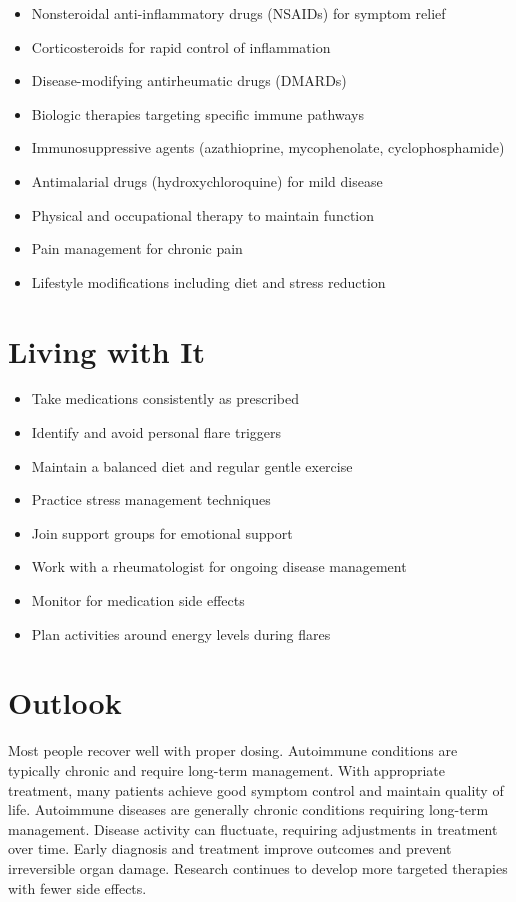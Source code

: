 \begin{itemize}[noitemsep]
  \item Nonsteroidal anti-inflammatory drugs (NSAIDs) for symptom relief
  \item Corticosteroids for rapid control of inflammation
  \item Disease-modifying antirheumatic drugs (DMARDs)
  \item Biologic therapies targeting specific immune pathways
  \item Immunosuppressive agents (azathioprine, mycophenolate, cyclophosphamide)
  \item Antimalarial drugs (hydroxychloroquine) for mild disease
  \item Physical and occupational therapy to maintain function
  \item Pain management for chronic pain
  \item Lifestyle modifications including diet and stress reduction
\end{itemize}
\section{Living with It}
\begin{itemize}[noitemsep]
  \item Take medications consistently as prescribed
  \item Identify and avoid personal flare triggers
  \item Maintain a balanced diet and regular gentle exercise
  \item Practice stress management techniques
  \item Join support groups for emotional support
  \item Work with a rheumatologist for ongoing disease management
  \item Monitor for medication side effects
  \item Plan activities around energy levels during flares
\end{itemize}
\section{Outlook}
Most people recover well with proper dosing. Autoimmune conditions are typically chronic and require long-term management. With appropriate treatment, many patients achieve good symptom control and maintain quality of life. Autoimmune diseases are generally chronic conditions requiring long-term management. Disease activity can fluctuate, requiring adjustments in treatment over time. Early diagnosis and treatment improve outcomes and prevent irreversible organ damage. Research continues to develop more targeted therapies with fewer side effects.
